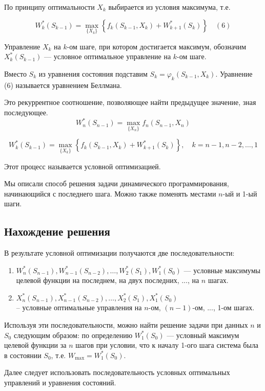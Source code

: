 \documentclass[17pt]{extarticle}
\begin{document}
По принципу оптимальности \( X_k \) выбирается из условия максимума, т.е.

\[
    W_k^*(S_{k-1}) = \max_{\{X_k\}} \left\{ f_k(S_{k-1}, X_k) + W_{k+1}^*(S_k) \right\} \quad (6)
\]

Управление \( X_k \) на \( k \)-ом шаге, при котором достигается максимум,
обозначим \( X_k^*(S_{k-1}) \) — условное оптимальное управление на \( k \)-ом шаге.

Вместо \( S_k \) из уравнения состояния подставим \( S_k = \varphi_k(S_{k-1}, X_k) \).
Уравнение (6) называется уравнением Беллмана.

Это рекуррентное соотношение, позволяющее найти предыдущее значение, зная последующее.
\[
    W_n^*(S_{n-1}) = \max_{\{X_n\}} f_n(S_{n-1}, X_n)
\]

\[
    W_k^*(S_{k-1}) = \max_{\{X_k\}} \left\{ f_k(S_{k-1}, X_k) + W_{k+1}^*(S_k) \right\}, \quad k = n-1, n-2, \ldots, 1
\]

Этот процесс называется условной оптимизацией.

Мы описали способ решения задачи динамического программирования, начинающийся с последнего шага.
Можно также поменять местами \( n \)-ый и 1-ый шаги.

\subsection{Нахождение решения}
В результате условной оптимизации получаются две последовательности:

\begin{enumerate}
    \item \( W_n^*(S_{n-1}), W_{n-1}^*(S_{n-2}), \ldots, W_2^*(S_1), W_1^*(S_0) \) — условные максимумы целевой функции на последнем,
          на двух последних, ..., на \( n \) шагах.

    \item \( X_n^*(S_{n-1}), X_{n-1}^*(S_{n-2}), \ldots, X_2^*(S_1), X_1^*(S_0) \) \\
          -- условные оптимальные управления на \( n \)-ом, \( (n-1) \)-ом, ..., 1-ом шагах.
\end{enumerate}

Используя эти последовательности, можно найти решение задачи при данных \( n \) и \( S_0 \) следующим образом:
по определению \( W_1^*(S_0) \) — условный максимум целевой функции за \( n \) шагов при условии, что к началу 1-ого шага система была в состоянии \( S_0 \), т.е. \( W_{\max} = W_1^*(S_0) \).

Далее следует использовать последовательность условных оптимальных управлений и уравнения состояний.
\end{document}

